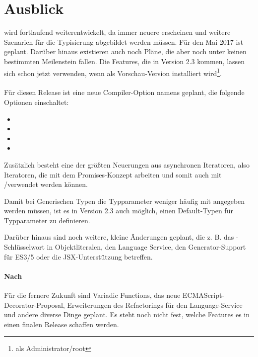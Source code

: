 \section{Ausblick}
\ts wird fortlaufend weiterentwickelt, da immer neuere \esss erscheinen und weitere Szenarien für die Typisierung abgebildet werden müssen. Für den Mai 2017 ist  geplant. Darüber hinaus existieren auch noch Pläne, die aber noch unter keinen bestimmten Meilenstein fallen. Die Features, die in Version 2.3 kommen, lassen sich schon jetzt verwenden, wenn \ts als Vorschau-Version installiert wird\footnote{ als Administrator/root}.

\paragraph{}
Für diesen Release ist eine neue Compiler-Option namens  geplant, die folgende Optionen einschaltet:
\begin{itemize}
\item {}
\item {}
\item {}
\item {}
\end{itemize}

Zusätzlich besteht eine der größten Neuerungen aus asynchronen Iteratoren, also Iteratoren, die mit dem Promises-Konzept arbeiten und somit auch mit \tsasync/\tsawait verwendet werden können.

Damit bei Generischen Typen die Typparameter weniger häufig mit angegeben werden müssen, ist es in Version 2.3 auch möglich, einen Default-Typen für Typparameter zu definieren.

Darüber hinaus sind noch weitere, kleine Änderungen geplant, die z. B. das \tsthis-Schlüsselwort in Objektliteralen, den Language Service, den Generator-Support für ES3/5 oder die JSX-Unterstützung betreffen.

\paragraph{Nach }
Für die fernere Zukunft sind Variadic Functions, das neue ECMA\-Script-Decorator-Proposal, Erweiterungen des Refactorings für den Language-Service und andere diverse Dinge geplant. Es steht noch nicht fest, welche Features es in einen finalen Release schaffen werden.

